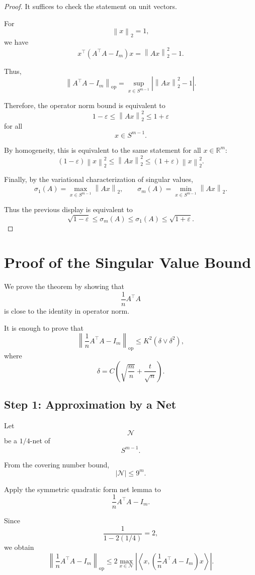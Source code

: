 \documentclass[12pt,oneside]{book}
\numberwithin{equation}{section}
\theoremstyle{definition}
\theoremstyle{plain}
\theoremstyle{remark}
\newcommand{\R}{\mathbb{R}}
\newcommand{\norm}[1]{\left\lVert #1 \right\rVert}
\newcommand{\inner}[2]{\left\langle #1, #2 \right\rangle}
\begin{document}
\begin{proof}
It suffices to check the statement on unit vectors.

For
\[
\norm{x}_2=1,
\]
we have
\[
x^\top(A^\top A-I_m)x
=
\norm{Ax}_2^2-1.
\]

Thus,
\[
\norm{A^\top A-I_m}_{\mathrm{op}}
=
\sup_{x\in S^{m-1}}
\left|
\norm{Ax}_2^2-1
\right|.
\]

Therefore, the operator norm bound is equivalent to
\[
1-\varepsilon
\leq
\norm{Ax}_2^2
\leq
1+\varepsilon
\]
for all
\[
x\in S^{m-1}.
\]

By homogeneity, this is equivalent to the same statement for all $x\in\R^m$:
\[
(1-\varepsilon)\norm{x}_2^2
\leq
\norm{Ax}_2^2
\leq
(1+\varepsilon)\norm{x}_2^2.
\]

Finally, by the variational characterization of singular values,
\[
\sigma_1(A)
=
\max_{x\in S^{m-1}}\norm{Ax}_2,
\qquad
\sigma_m(A)
=
\min_{x\in S^{m-1}}\norm{Ax}_2.
\]

Thus the previous display is equivalent to
\[
\sqrt{1-\varepsilon}
\leq
\sigma_m(A)
\leq
\sigma_1(A)
\leq
\sqrt{1+\varepsilon}.
\]
\end{proof}

\section{Proof of the Singular Value Bound}

We prove the theorem by showing that
\[
\frac{1}{n}A^\top A
\]
is close to the identity in operator norm.

It is enough to prove that
\[
\norm{\frac{1}{n}A^\top A-I_m}_{\mathrm{op}}
\leq
K^2(\delta\vee \delta^2),
\]
where
\[
\delta
=
C\left(
\sqrt{\frac{m}{n}}+\frac{t}{\sqrt{n}}
\right).
\]

\subsection{Step 1: Approximation by a Net}

Let
\[
\mathcal{N}
\]
be a $1/4$-net of
\[
S^{m-1}.
\]

From the covering number bound,
\[
|\mathcal{N}|
\leq
9^m.
\]

Apply the symmetric quadratic form net lemma to
\[
\frac{1}{n}A^\top A-I_m.
\]

Since
\[
\frac{1}{1-2(1/4)}=2,
\]
we obtain
\[
\norm{\frac{1}{n}A^\top A-I_m}_{\mathrm{op}}
\leq
2
\max_{x\in\mathcal{N}}
\left|
\inner{x}{
\left(
\frac{1}{n}A^\top A-I_m
\right)x}
\right|.
\]
\end{document}
